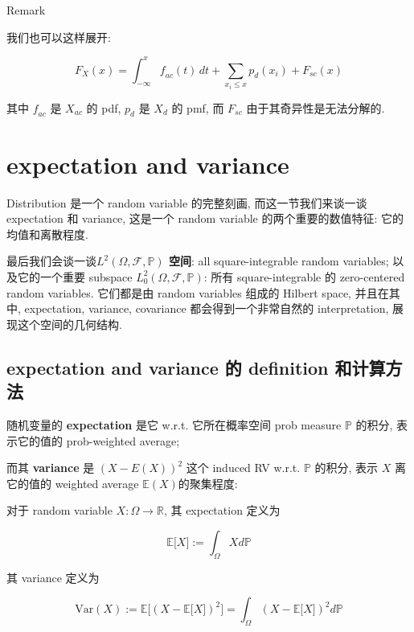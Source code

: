 \begin{qlremark}{Remark}

我们也可以这样展开:

\[\mathit{F}_{\mathit{X}}(\mathit{x}) = \int_{- \infty}^{\mathit{x}}\mathit{f}_{\mathit{a}\mathit{c}}(\mathit{t})\,\mathit{d}\mathit{t} + \sum\limits_{\mathit{x}_{\mathit{i}} \leq \mathit{x}}\mathit{p}_{\mathit{d}}(\mathit{x}_{\mathit{i}}) + \mathit{F}_{\mathit{s}\mathit{c}}(\mathit{x})\]

其中 \(\mathit{f}_{\mathit{a}\mathit{c}}\) 是 \(\mathit{X}_{\mathit{a}\mathit{c}}\) 的 pdf, \(\mathit{p}_{\mathit{d}}\) 是 \(\mathit{X}_{\mathit{d}}\) 的 pmf, 而 \(\mathit{F}_{\mathit{s}\mathit{c}}\) 由于其奇异性是无法分解的.

\end{qlremark}

\section{expectation and variance}\label{expectation-and-variance}

Distribution 是一个 random variable 的完整刻画, 而这一节我们来谈一谈 expectation 和 variance, 这是一个 random variable 的两个重要的数值特征: 它的均值和离散程度.

最后我们会谈一谈\textbf{\(\mathit{L}^{2}(\Omega,\mathcal{F},\mathbb{P})\) 空间}: all square-integrable random variables; 以及它的一个重要 subspace \(\mathit{L}_{0}^{2}(\Omega,\mathcal{F},\mathbb{P})\): 所有 square-integrable 的 zero-centered random variables. 它们都是由 random variables 组成的 Hilbert space, 并且在其中, expectation, variance, covariance 都会得到一个非常自然的 interpretation, 展现这个空间的几何结构.

\subsection{expectation and variance 的 definition 和计算方法}\label{expectation-and-variance-ux7684-definition-ux548cux8ba1ux7b97ux65b9ux6cd5}

随机变量的 \textbf{expectation} 是它 w.r.t. 它所在概率空间 prob measure \(\mathbb{P}\) 的积分, 表示它的值的 prob-weighted average;

而其 \textbf{variance} 是 \((\mathit{X} - \mathit{E}(\mathit{X}))^{2}\) 这个 induced RV w.r.t. \(\mathbb{P}\) 的积分, 表示 \(\mathit{X}\) 离它的值的 weighted average \(\mathbb{E}(\mathit{X})\)的聚集程度:

\begin{definition}{}

对于 random variable \(\mathit{X}:\Omega\rightarrow\mathbb{R}\), 其 expectation 定义为

\[\mathbb{E}\lbrack\mathit{X}\rbrack := \int_{\Omega}\mathit{X}\mathit{d}\mathbb{P}\]

其 variance 定义为

\[\text{Var}(\mathit{X}) := \mathbb{E}\lbrack(\mathit{X} - \mathbb{E}\lbrack\mathit{X}\rbrack)^{2}\rbrack = \int_{\Omega}(\mathit{X} - \mathbb{E}\lbrack\mathit{X}\rbrack)^{2}\mathit{d}\mathbb{P}\]

\end{definition}

